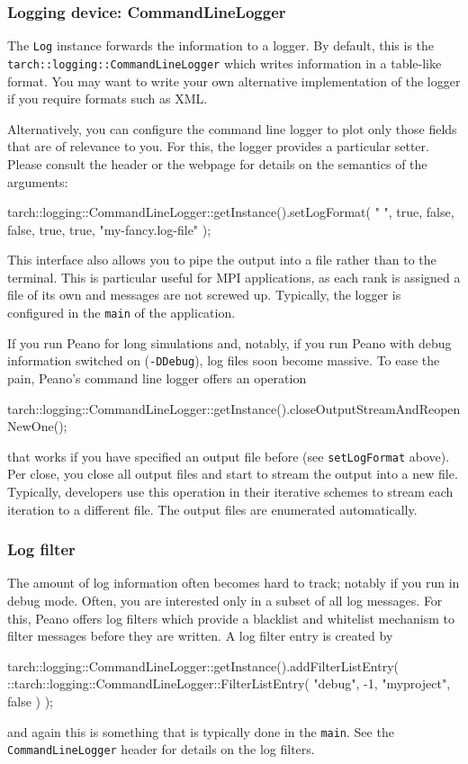 \subsubsection{Logging device: CommandLineLogger}

The \texttt{Log} instance forwards the information to a logger. By default, this
is the \\ \texttt{tarch::logging::CommandLineLogger} which writes information
in a table-like format. You may want to write your own alternative
implementation of the logger if you require formats such as XML.

Alternatively, you can configure the command line logger to plot only those
fields that are of relevance to you.
For this, the logger provides a particular setter.
Please consult the header or the webpage for details on the semantics of the
arguments:
\begin{code}
tarch::logging::CommandLineLogger::getInstance().setLogFormat(
  " ", true, false, false, true, true, "my-fancy.log-file" );
\end{code} 

\noindent
This interface also allows you to pipe the output into a file rather than to the
terminal.
This is particular useful for MPI applications, as each rank is assigned a file
of its own and messages are not screwed up.
Typically, the logger is configured in the \texttt{main} of the application.

If you run Peano for long simulations and, notably, if you run Peano with debug
information switched on (\texttt{-DDebug}), log files soon become massive.
To ease the pain, Peano's command line logger offers an operation 
\begin{code}
tarch::logging::CommandLineLogger::getInstance().closeOutputStreamAndReopenNewOne();
\end{code} 
\noindent
that works if you have specified an output file before (see
\texttt{setLogFormat} above). Per close, you close all output files and start to
stream the output into a new file.
Typically, developers use this operation in their iterative schemes to stream
each iteration to a different file.
The output files are enumerated automatically.



\subsubsection{Log filter}

The amount of log information often becomes hard to track; notably if you run in
debug mode.
Often, you are interested only in a subset of all log messages.
For this, Peano offers log filters which provide a blacklist and whitelist
mechanism to filter messages before they are written.
A log filter entry is created by 
\begin{code}
    tarch::logging::CommandLineLogger::getInstance().addFilterListEntry( 
      ::tarch::logging::CommandLineLogger::FilterListEntry( 
        "debug", -1, "myproject", false ) );
\end{code} 
\noindent
and again this is something that is typically done in the \texttt{main}.
See the \texttt{CommandLineLogger} header for details on the log filters.



